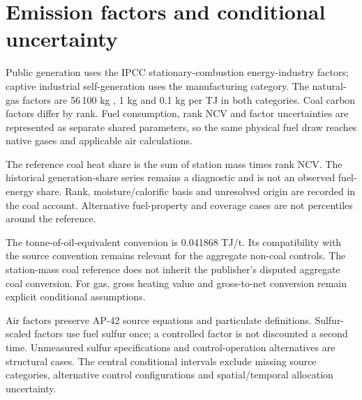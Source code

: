 \section{Emission factors and conditional uncertainty}
\label{sec:factors}
Public generation uses the IPCC stationary-combustion energy-industry factors; captive industrial self-generation uses the manufacturing category. The natural-gas factors are 56\,100 kg \COtwo{}, 1 kg \CHfour{} and 0.1 kg \NtwoO{} per TJ in both categories. Coal carbon factors differ by rank. Fuel consumption, rank NCV and factor uncertainties are represented as separate shared parameters, so the same physical fuel draw reaches native gases and applicable air calculations.

The reference coal heat share is the sum of station mass times rank NCV. The historical generation-share series remains a diagnostic and is not an observed fuel-energy share. Rank, moisture/calorific basis and unresolved origin are recorded in the coal account. Alternative fuel-property and coverage cases are not percentiles around the reference.

The tonne-of-oil-equivalent conversion is 0.041868 TJ/t. Its compatibility with the source convention remains relevant for the aggregate non-coal controls. The station-mass coal reference does not inherit the publisher's disputed aggregate coal conversion. For gas, gross heating value and gross-to-net conversion remain explicit conditional assumptions.

Air factors preserve AP-42 source equations and particulate definitions. Sulfur-scaled factors use fuel sulfur once; a controlled factor is not discounted a second time. Unmeasured sulfur specifications and control-operation alternatives are structural cases. The central conditional intervals exclude missing source categories, alternative control configurations and spatial/temporal allocation uncertainty.
